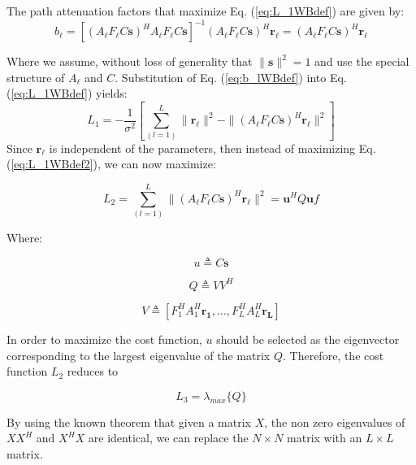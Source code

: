 \documentclass[10pt,a4paper]{report}
\begin{document}
The path attenuation factors that maximize Eq. (\ref{eq:L_1WBdef}) are given by:
\begin{equation}
\label{eq:b_lWBdef}
b_\ell = [(A_\ell F_\ell C \mathbf{s})^{H} A_\ell F_\ell C \mathbf{s}]^{-1}(A_\ell F_\ell C \mathbf{s})^{H} \mathbf{r_\ell} = (A_\ell F_\ell C \mathbf{s})^{H} \mathbf{r_\ell}
\end{equation}

Where we assume, without loss of generality that $\|\mathbf{s}\|^2=1$ and use the special structure of $A_\ell$ and $C$.
Substitution of Eq. (\ref{eq:b_lWBdef}) into Eq. (\ref{eq:L_1WBdef}) yields:
\begin{equation}
\label{eq:L_1WBdef2}
L_1=-\frac{1}{\sigma^2} [\sum_{(l=1)}^{L}\|\mathbf{r_\ell}\|^2 -\|(A_\ell F_\ell C \mathbf{s})^H \mathbf{r_\ell}\|^2]
\end{equation}
Since $\mathbf{r_\ell}$ is independent of the parameters, then instead of maximizing Eq. (\ref{eq:L_1WBdef2}), we can now maximize:

\begin{equation}
\label{eq:L_2WBdef}
L_2=\sum_{(l=1)}^{L}\|(A_\ell F_\ell C \mathbf{s})^H \mathbf{r_\ell}\|^2 = \mathbf{u}^HQ\mathbf{u}f
\end{equation}

Where:

\begin{equation}
u \triangleq C \mathbf{s}
\end{equation}

\begin{equation}
Q \triangleq V V^H
\end{equation}


\begin{equation}
V \triangleq [F_1^H A_1^H \mathbf{r_1},\dots ,F_L^H A_L^H \mathbf{r_L}]                                                        
\end{equation}

In order to maximize the cost function, $u$ should be selected as the eigenvector corresponding to the largest eigenvalue of the matrix $Q$.
Therefore, the cost function $L_2$ reduces to

\begin{equation}
L_3=\lambda_{max}\{Q\}
\end{equation}

By using the known theorem that given a matrix $X$, the non zero eigenvalues of $XX^H$ and $X^H X$ are identical, we can replace the $N \times N$ matrix with an $L \times L$ matrix. 
\end{document}
